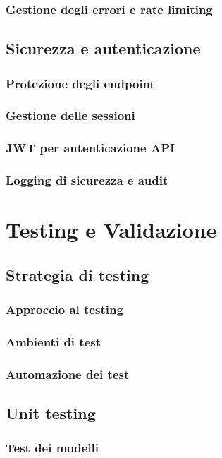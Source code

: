 \documentclass[12pt,a4paper,oneside]{report}
\begin{document}
\subsection{Gestione degli errori e rate limiting}

\section{Sicurezza e autenticazione}
\subsection{Protezione degli endpoint}
\subsection{Gestione delle sessioni}
\subsection{JWT per autenticazione API}
\subsection{Logging di sicurezza e audit}





\chapter{Testing e Validazione}
\section{Strategia di testing}
\subsection{Approccio al testing}
\subsection{Ambienti di test}
\subsection{Automazione dei test}

\section{Unit testing}
\subsection{Test dei modelli}
\end{document}
